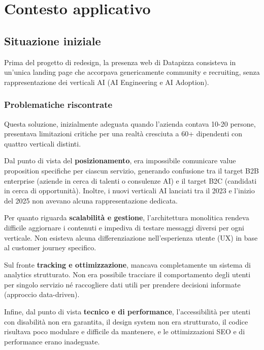 \chapter{Contesto applicativo}
\sloppypar
\section{Situazione iniziale}
Prima del progetto di redesign, la presenza web di Datapizza consisteva 
in un'unica landing page che accorpava genericamente community e 
recruiting, senza rappresentazione dei verticali AI (AI Engineering e 
AI Adoption).

\subsection{Problematiche riscontrate}
Questa soluzione, inizialmente adeguata quando l'azienda contava 10-20 persone, 
presentava limitazioni critiche per una realtà cresciuta a 60+ dipendenti 
con quattro verticali distinti.

\medskip
Dal punto di vista del \textbf{posizionamento}, era impossibile comunicare 
value proposition specifiche per ciascun servizio, generando confusione 
tra il target B2B enterprise (aziende in cerca di talenti o consulenze AI) 
e il target B2C (candidati in cerca di opportunità). Inoltre, i nuovi 
verticali AI lanciati tra il 2023 e l'inizio del 2025 non avevano alcuna 
rappresentazione dedicata.

\medskip
Per quanto riguarda \textbf{scalabilità e gestione}, l'architettura 
monolitica rendeva difficile aggiornare i contenuti e impediva di testare 
messaggi diversi per ogni verticale. Non esisteva alcuna differenziazione 
nell'esperienza utente (UX) in base al customer journey specifico.

\medskip
Sul fronte \textbf{tracking e ottimizzazione}, mancava completamente un 
sistema di analytics strutturato. Non era possibile tracciare il 
comportamento degli utenti per singolo servizio né raccogliere dati utili 
per prendere decisioni informate (approccio data-driven).

\medskip
Infine, dal punto di vista \textbf{tecnico e di performance}, 
l'accessibilità 
per utenti con disabilità non era garantita, il design system non era 
strutturato, il codice risultava poco modulare e difficile da mantenere, 
e le ottimizzazioni SEO e di performance erano inadeguate.

